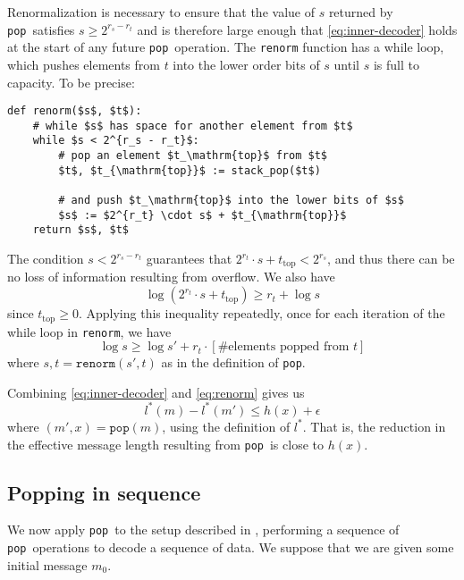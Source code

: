 \documentclass{article}
\theoremstyle{definition}
\newcommand{\pop}{\texttt{pop}}
\begin{document}
  Renormalization is necessary to ensure that the value of \(s\) returned by
  \pop\ satisfies \(s\geq2^{r_s - r_t}\) and is therefore large enough that
  \cref{eq:inner-decoder} holds at the start of any future \pop\ operation. The
  \texttt{renorm} function has a while loop, which pushes elements from \(t\)
  into the lower order bits of \(s\) until \(s\) is full to capacity. To be
  precise:
  \begin{lstlisting}[frame=single]
def renorm($s$, $t$):
    # while $s$ has space for another element from $t$
    while $s < 2^{r_s - r_t}$:
        # pop an element $t_\mathrm{top}$ from $t$
        $t$, $t_{\mathrm{top}}$ := stack_pop($t$)

        # and push $t_\mathrm{top}$ into the lower bits of $s$
        $s$ := $2^{r_t} \cdot s$ + $t_{\mathrm{top}}$
    return $s$, $t$
  \end{lstlisting}

  The condition \(s < 2^{r_s - r_t}\) guarantees that \(2^{r_t} \cdot s +
  t_{\text{top}} < 2^{r_s}\), and thus there can be no loss of information
  resulting from overflow. We also have
  \begin{equation}
    \log (2^{r_t} \cdot s + t_\text{top}) \geq r_t + \log s
  \end{equation}
  since \(t_{\text{top}} \geq 0\).  Applying this inequality repeatedly, once
  for each iteration of the while loop in \texttt{renorm}, we have
  \begin{equation}\label{eq:renorm}
    \log s \geq \log s' + r_t\cdot\left[\text{\# elements popped from
    \(t\)}\right]
  \end{equation}
  where \(s, t = \texttt{renorm}(s', t)\) as in the definition of \pop.

  Combining \cref{eq:inner-decoder} and \cref{eq:renorm} gives us
  \begin{equation}\label{eq:pop-inequality}
    l^*(m) - l^*(m') \leq h(x) + \epsilon
  \end{equation}
  where \((m', x) = \pop(m)\), using the definition of \(l^*\). That is, the
  reduction in the effective message length resulting from \pop\ is close to
  \(h(x)\).


\subsection{Popping in sequence}\label{seq:pop-seq}
  We now apply \pop\ to the setup described in , performing
  a sequence of \pop\ operations to decode a sequence of data. We suppose that
  we are given some initial message \(m_0\).
\end{document}

